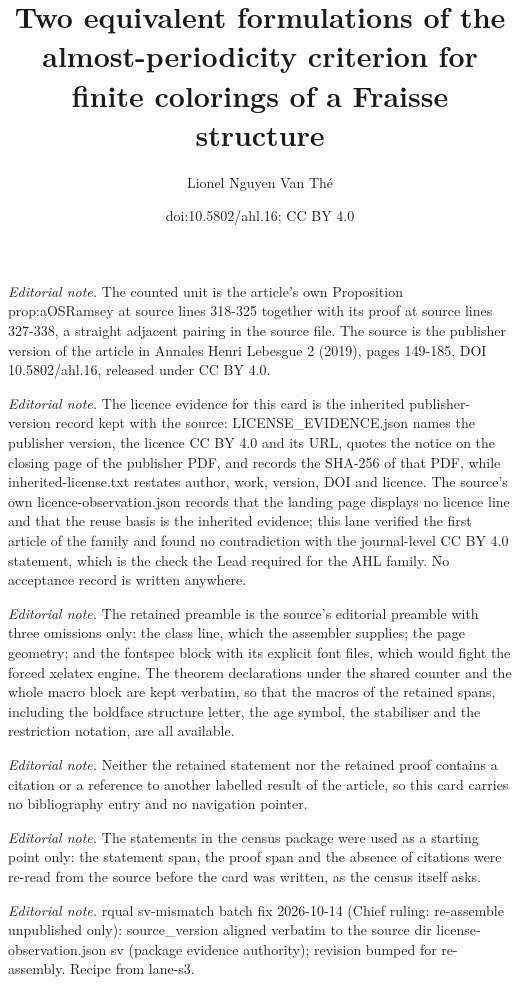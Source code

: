 \documentclass[10pt,a4paper]{article}
\title{Two equivalent formulations of the almost-periodicity criterion for finite colorings of a Fraisse structure}
\author{Lionel Nguyen Van Thé}
\date{doi:10.5802/ahl.16; CC BY 4.0}
\theoremstyle{definition}
\numberwithin{equation}{section}
\numberwithin{figure}{section}
\numberwithin{table}{section}
\begin{document}
\maketitle
\noindent\textit{Editorial note.} The counted unit is the article's own Proposition prop:aOSRamsey at source lines 318-325 together with its proof at source lines 327-338, a straight adjacent pairing in the source file. The source is the publisher version of the article in Annales Henri Lebesgue 2 (2019), pages 149-185, DOI 10.5802/ahl.16, released under CC BY 4.0.\par\medskip
\noindent\textit{Editorial note.} The licence evidence for this card is the inherited publisher-version record kept with the source: LICENSE\_EVIDENCE.json names the publisher version, the licence CC BY 4.0 and its URL, quotes the notice on the closing page of the publisher PDF, and records the SHA-256 of that PDF, while inherited-license.txt restates author, work, version, DOI and licence. The source's own licence-observation.json records that the landing page displays no licence line and that the reuse basis is the inherited evidence; this lane verified the first article of the family and found no contradiction with the journal-level CC BY 4.0 statement, which is the check the Lead required for the AHL family. No acceptance record is written anywhere.\par\medskip
\noindent\textit{Editorial note.} The retained preamble is the source's editorial preamble with three omissions only: the class line, which the assembler supplies; the page geometry; and the fontspec block with its explicit font files, which would fight the forced xelatex engine. The theorem declarations under the shared counter and the whole macro block are kept verbatim, so that the macros of the retained spans, including the boldface structure letter, the age symbol, the stabiliser and the restriction notation, are all available.\par\medskip
\noindent\textit{Editorial note.} Neither the retained statement nor the retained proof contains a citation or a reference to another labelled result of the article, so this card carries no bibliography entry and no navigation pointer.\par\medskip
\noindent\textit{Editorial note.} The statements in the census package were used as a starting point only: the statement span, the proof span and the absence of citations were re-read from the source before the card was written, as the census itself asks.\par\medskip
\noindent\textit{Editorial note.} rqual sv-mismatch batch fix 2026-10-14 (Chief ruling: re-assemble unpublished only): source\_version aligned verbatim to the source dir license-observation.json sv (package evidence authority); revision bumped for re-assembly. Recipe from lane-s3.\par\medskip
\end{document}
